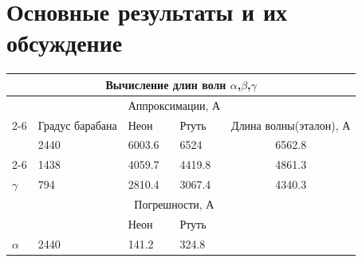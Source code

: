 \documentclass[%
 reprint,
 amsmath,amssymb,
 aps,
]{revtex4-2}
\begin{document}
\section{Основные результаты и их обсуждение}



\begin{table}[]
	\begin{tabular}{|l|l|l|l|l|l|}
		\hline
		\multicolumn{6}{|c|}{{\color[HTML]{FF0000} Вычисление   длин волн $\alpha$,$\beta$,$\gamma$}}                                                                                                                           \\ \hline
		&                                                 & \multicolumn{2}{c|}{Аппроксимации, А}                      &                              &                                 \\ \cline{2-6} 
		\multirow{-2}{*}{}  & Градус барабана                                 & Неон                        & Ртуть                        & \multicolumn{2}{c|}{Длина волны(эталон), А}                    \\ \hline
		& 2440                                            & 6003.6                      & 6524                         & \multicolumn{2}{c|}{6562.8}                                    \\ \cline{2-6} 
		\multirow{-2}{*}{$\alphaб \beta$} & 1438                                            & 4059.7                      & 4419.8                       & \multicolumn{2}{c|}{4861.3}                                    \\ \hline
		$\gamma$                   & 794                                             & 2810.4                      & 3067.4                       & \multicolumn{2}{c|}{4340.3}                                    \\ \hline
		&                                                 & \multicolumn{2}{c|}{Погрешности, А}                        &                              &                                 \\ \hline
		&                                                 & Неон                        & Ртуть                        &                              &                                 \\ \hline
		$\alpha$                   & 2440                                            & 141.2                       & 324.8                        &                              &                                 \\ \hline

\end{tabular}
\end{table}
\end{document}
